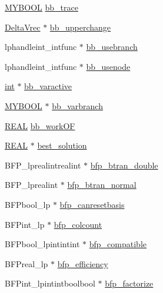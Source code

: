 \begin{DoxyCompactItemize}
\item 
\hyperlink{lp__lib_8h_aad848328fb3018217ac9f01d97b6bd88}{M\+Y\+B\+O\+OL} \hyperlink{struct__lprec_a09a0b2677367ff58da2b54a3facb8cec}{bb\+\_\+trace}
\item 
\hyperlink{lp__matrix_8h_ad2fc3f0ece09bd21c244ef3657a0feb1}{Delta\+Vrec} $\ast$ \hyperlink{struct__lprec_a7fb304b3e55015206dfef67bff8ee8fe}{bb\+\_\+upperchange}
\item 
lphandleint\+\_\+intfunc $\ast$ \hyperlink{struct__lprec_a65b3830bcdb7b1b3a88f8aaf2f23732f}{bb\+\_\+usebranch}
\item 
lphandleint\+\_\+intfunc $\ast$ \hyperlink{struct__lprec_a0e742690229f435840cf80abd5513ea4}{bb\+\_\+usenode}
\item 
\hyperlink{lp__lib_8h_adeb9ec6400320e4923ac9d836d509ddb}{int} $\ast$ \hyperlink{struct__lprec_a2f227802f1da0c6c56acd80f31d394bf}{bb\+\_\+varactive}
\item 
\hyperlink{lp__lib_8h_aad848328fb3018217ac9f01d97b6bd88}{M\+Y\+B\+O\+OL} $\ast$ \hyperlink{struct__lprec_a3e56812291566a89122fc81256e31481}{bb\+\_\+varbranch}
\item 
\hyperlink{lp__lib_8h_a92bd5e363d131fa73669358edb232dce}{R\+E\+AL} \hyperlink{struct__lprec_af84b368f7d37f520f98ef064752e1237}{bb\+\_\+work\+OF}
\item 
\hyperlink{lp__lib_8h_a92bd5e363d131fa73669358edb232dce}{R\+E\+AL} $\ast$ \hyperlink{struct__lprec_a7a47ffab23a72917353f107702be4215}{best\+\_\+solution}
\item 
B\+F\+P\+\_\+lprealintrealint $\ast$ \hyperlink{struct__lprec_abab282191669404b33f7f7792efe6b0c}{bfp\+\_\+btran\+\_\+double}
\item 
B\+F\+P\+\_\+lprealint $\ast$ \hyperlink{struct__lprec_a9d2e7be74c88c6d3580f54584bd44ac6}{bfp\+\_\+btran\+\_\+normal}
\item 
B\+F\+Pbool\+\_\+lp $\ast$ \hyperlink{struct__lprec_aaf105bf72551e8fa2761d586cea7f8df}{bfp\+\_\+canresetbasis}
\item 
B\+F\+Pint\+\_\+lp $\ast$ \hyperlink{struct__lprec_a15105c014043e4393b824a983ffd7431}{bfp\+\_\+colcount}
\item 
B\+F\+Pbool\+\_\+lpintintint $\ast$ \hyperlink{struct__lprec_af76b558d29f020806b703764e159a272}{bfp\+\_\+compatible}
\item 
B\+F\+Preal\+\_\+lp $\ast$ \hyperlink{struct__lprec_a600f5fdaba28fdda7f1ddd15f1aee5e9}{bfp\+\_\+efficiency}
\item 
B\+F\+Pint\+\_\+lpintintboolbool $\ast$ \hyperlink{struct__lprec_a6bc312ad89be262ce13ffa336dbcbd7e}{bfp\+\_\+factorize}

\end{DoxyCompactItemize}
